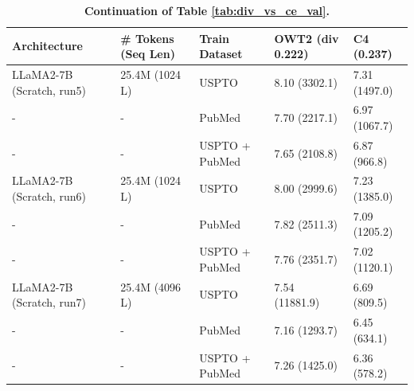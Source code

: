 \documentclass[10pt]{article} %
\begin{document}
\begin{table}[h]
\caption{\textbf{Continuation of Table \ref{tab:div_vs_ce_val}.}}
\vspace{10pt}
\centering
\begin{tabularx}{1\textwidth}{lXXXX} 
\bottomrule 
Architecture & \# Tokens (Seq Len) & Train Dataset  & OWT2 (\textbf{div 0.222})  & C4 (\textbf{0.237}) \\
\bottomrule 
LLaMA2-7B (Scratch, run5) & 25.4M (1024 L) & USPTO  & 8.10 (3302.1) & 7.31 (1497.0) \\ %
- & - & PubMed & 7.70 (2217.1) & 6.97 (1067.7) \\ %
- & - & USPTO + PubMed & 7.65 (2108.8) & 6.87 (966.8) \\ %
\hline
LLaMA2-7B (Scratch, run6) & 25.4M  (1024 L) & USPTO  & 8.00 (2999.6) & 7.23 (1385.0) \\ %
- & - & PubMed & 7.82 (2511.3) & 7.09 (1205.2) \\ %
- & - & USPTO + PubMed & 7.76 (2351.7) & 7.02 (1120.1) \\ %
\hline

LLaMA2-7B (Scratch, run7) & 25.4M (4096 L) & USPTO  & 7.54 (11881.9) & 6.69 (809.5) \\ %
- & - & PubMed & 7.16 (1293.7) & 6.45 (634.1) \\ %
- & - & USPTO + PubMed & 7.26 (1425.0) & 6.36 (578.2) \\ %
\hline



\end{tabularx}
\end{table}
\end{document}
